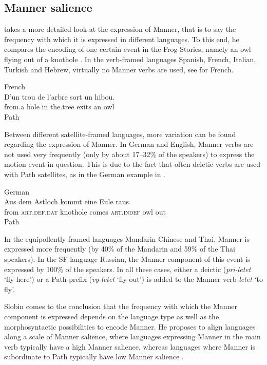 \documentclass[output=paper,colorlinks,citecolor=brown]{langscibook}
\begin{document}
\subsection{Manner salience}

\citet{Slobin_2004} takes a more detailed look at the expression of Manner, that is to say the frequency with which it is expressed in different languages. To this end, he compares the encoding of one certain event in the Frog Stories, namely an owl flying out of a knothole \citep[224--225]{Slobin_2004}. In the verb-framed languages Spanish, French, Italian, Turkish and Hebrew, virtually no Manner verbs are used, see  for French.

\ea\label{ex:3:5}French \citep[224]{Slobin_2004}\\
\glll D'un trou de l'arbre sort un hibou.\\
      from.a hole in the.tree  exits  an owl\\
      {}   {}  {} {}     Path {} {} \\ 
\z

Between different satellite-framed languages, more variation can be found regarding the expression of Manner. In German and English, Manner verbs are not used very frequently (only by about 17--32\% of the speakers) to express the motion event in question. This is due to the fact that often deictic verbs are used with Path satellites, as in the German example in .

\ea\label{ex:3:6}German\\
\glll  Aus dem Astloch kommt eine Eule raus.\\
      from \textsc{art.def.dat} knothole comes  \textsc{art.indef} owl out \\
      {}   {}  {}     {}    {}   {}  Path\\
\z

In the equipollently-framed languages Mandarin Chinese and Thai, Manner is expressed more frequently (by 40\% of the Mandarin and 59\% of the Thai speakers). In the SF language Russian, the Manner component of this event is expressed by 100\% of the speakers. In all these cases, either a deictic (\emph{pri-letet} `fly here') or a Path-prefix (\emph{vy-letet} `fly out') is added to the Manner verb \emph{letet} `to fly'.

Slobin comes to the conclusion that the frequency with which the Manner component is expressed depends on the language type as well as the morphosyntactic possibilities to encode Manner. He proposes to align languages along a scale of Manner salience, where languages expressing Manner in the main verb typically have a high Manner salience, whereas languages where Manner is subordinate to Path typically have low Manner salience \citep[250]{Slobin_2004}.
\end{document}

